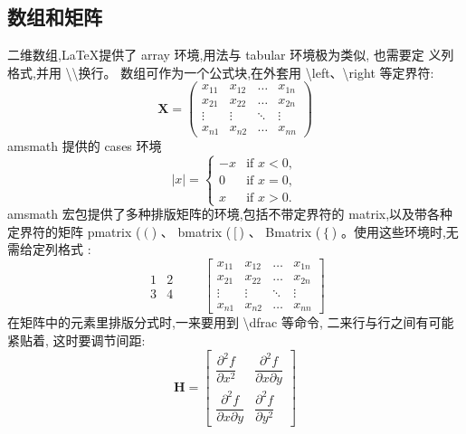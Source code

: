 \documentclass[a4paper]{ctexart}
\begin{document}
    \subsection{数组和矩阵}
    二维数组,\LaTeX 提供了 array 环境,用法与 tabular 环境极为类似,%
    也需要定 义列格式,并用 \textbackslash \textbackslash 换行。%
    数组可作为一个公式块,在外套用 \textbackslash left、\textbackslash right 等定界符:
    \[
        \mathbf{X} = \left(
            \begin{array}{cccc}
                x_{11} & x_{12} & \ldots & x_{1n}   \\
                x_{21} & x_{22} & \ldots & x_{2n}   \\
                \vdots & \vdots & \ddots & \vdots   \\
                x_{n1} & x_{n2} & \ldots & x_{nn}
            \end{array}    
        \right)  
    \]
    amsmath 提供的 cases 环境
    \[
        |x| =
        \begin{cases}
            - x & \text{if } x < 0, \\
            0   & \text{if } x = 0, \\
            x   & \text{if } x > 0.
        \end{cases}
    \]
    amsmath 宏包提供了多种排版矩阵的环境,包括不带定界符的 matrix,以及带各种定界符的矩阵 pmatrix ($\left(\right.$) 、
    bmatrix ($\left[\right.$) 、 Bmatrix ($\left\{\right.$) 。使用这些环境时,无需给定列格式 :
    \[
        \begin{matrix}
            1 & 2   \\
            3 & 4
        \end{matrix}    \qquad
        \begin{bmatrix}
            x_{11} & x_{12} & \ldots & x_{1n} \\
            x_{21} & x_{22} & \ldots & x_{2n} \\
            \vdots & \vdots & \ddots & \vdots \\
            x_{n1} & x_{n2} & \ldots & x_{nn}
        \end{bmatrix}
    \]
    在矩阵中的元素里排版分式时,一来要用到 \textbackslash dfrac 等命令,%
    二来行与行之间有可能紧贴着, 这时要调节间距:
    \[
        \mathbf{H} =
        \begin{bmatrix}
            \dfrac{\partial^2 f}{\partial x^2}         & \dfrac{\partial^2 f}{\partial x\partial y} \\[8pt]
            \dfrac{\partial^2 f}{\partial x\partial y} & \dfrac{\partial^2 f}{\partial y^2}
        \end{bmatrix}    
    \]
\end{document}
